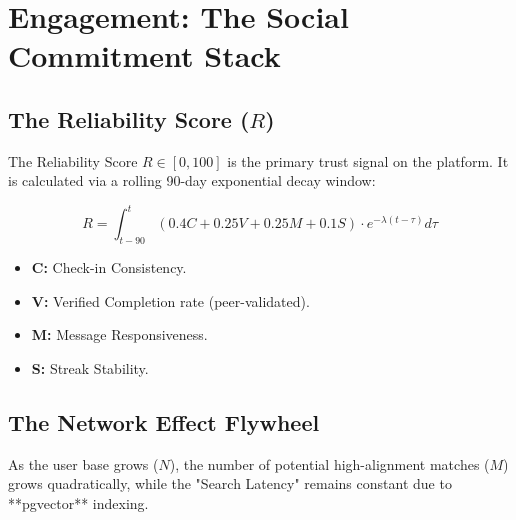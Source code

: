 \documentclass[11pt,a4paper,oneside]{article}
\begin{document}
\section{Engagement: The Social Commitment Stack}

\subsection{The Reliability Score ($R$)}
The Reliability Score $R \in [0, 100]$ is the primary trust signal on the platform. It is calculated via a rolling 90-day exponential decay window:

\begin{equation}
R = \int_{t-90}^{t} (0.4C + 0.25V + 0.25M + 0.1S) \cdot e^{-\lambda(t-\tau)} d\tau
\end{equation}

\begin{itemize}
    \item \textbf{C:} Check-in Consistency.
    \item \textbf{V:} Verified Completion rate (peer-validated).
    \item \textbf{M:} Message Responsiveness.
    \item \textbf{S:} Streak Stability.
\end{itemize}

\subsection{The Network Effect Flywheel}
As the user base grows ($N$), the number of potential high-alignment matches ($M$) grows quadratically, while the "Search Latency" remains constant due to **pgvector** indexing.

\begin{center}
\end{center}
\end{document}
